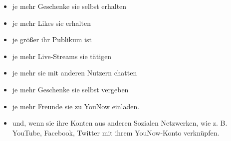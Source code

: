 \begin{itemize}
	\item je mehr Geschenke sie selbst erhalten
	\item je mehr Likes sie erhalten
	\item je größer ihr Publikum ist
	\item je mehr Live-Streams sie tätigen
	\item je mehr sie mit anderen Nutzern chatten
	\item je mehr Geschenke sie selbst vergeben
	\item je mehr Freunde sie zu YouNow einladen.
	\item und, wenn sie ihre Konten aus anderen Sozialen Netzwerken, wie z. B. YouTube, Facebook, Twitter mit ihrem YouNow-Konto verknüpfen.
\end{itemize}
